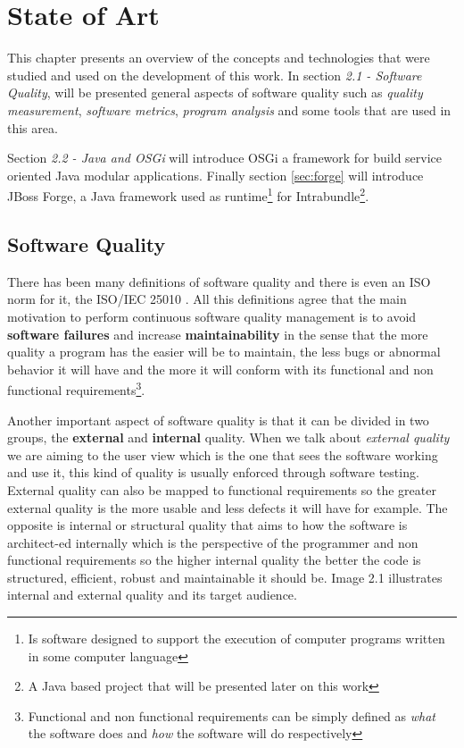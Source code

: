 \chapter{State of Art}
This chapter presents an overview of the concepts and technologies that were studied and used on the development of this work. 
In section \textit{2.1 - Software Quality}, will be presented general aspects of software quality such as \textit{quality measurement},  \textit{software metrics}, \textit{program analysis} and some tools that are used in this area.  

Section \textit{2.2 - Java and OSGi} will introduce OSGi a framework for build service oriented Java modular applications. Finally section \ref{sec:forge} will introduce JBoss Forge, a Java framework used as runtime\footnote{Is software designed to support the execution of computer programs written in some computer language} for Intrabundle\footnote{A Java based project that will be presented later on this work}.   


\section{Software Quality}
\label{sec:quality}
There has been many definitions of software quality \citep[p. 23]{Kan 2002} and there is even an ISO norm for it, the ISO/IEC 25010 \citep{iso 2011}. All this definitions agree that the main motivation to perform continuous software quality management is to avoid \textbf{software failures} and increase \textbf{maintainability} in the sense that the more quality a program has the easier will be to maintain, the less bugs or abnormal behavior it will have and the more it will conform with its functional and non functional requirements\footnote{Functional and non functional requirements can be simply defined as \textit{what} the software does and \textit{how} the software will do respectively}. 

Another important aspect of software quality is that it can be divided in two groups, the \textbf{external} and \textbf{internal} quality. When we talk about \textit{external quality} we are aiming to the user view which is the one that sees the software working and use it, this kind of quality is usually enforced through software testing. External quality can also be mapped to functional requirements so the greater external quality is the more usable and less defects it will have for example. The opposite is internal or structural quality that aims to how the software is architect-ed internally which is the perspective of the programmer and non functional requirements so the higher internal quality the better the code is structured, efficient, robust and maintainable it should be. Image 2.1 illustrates internal and external quality and its target audience.


